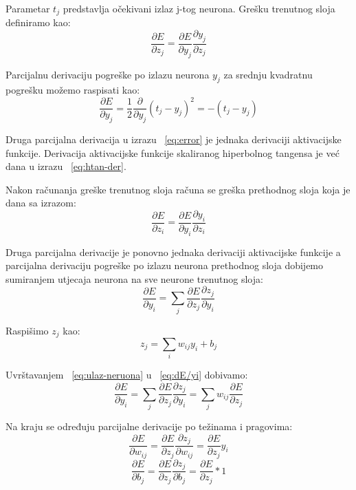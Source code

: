 \documentclass[times, utf8, zavrsni]{fer}
\begin{document}
Parametar $t_j$ predstavlja očekivani izlaz j-tog neurona. Grešku trenutnog sloja definiramo kao:
\begin{equation}\label{eq:error}
\dfrac{\partial E}{\partial z_j} = \dfrac{\partial E}{\partial y_j} \dfrac{\partial y_j}{\partial z_j}
\end{equation}

Parcijalnu derivaciju pogreške po izlazu neurona $y_j$ za srednju kvadratnu pogrešku možemo raspisati kao:
\begin{equation}\label{eq:sr-kv-pogr-der}
\dfrac{\partial E}{\partial y_j} = \frac{1}{2}\dfrac{\partial}{\partial y_j}(t_j-y_j)^2 = -(t_j - y_j)
\end{equation}

Druga parcijalna derivacija u izrazu ~\ref{eq:error} je jednaka derivaciji aktivacijske funkcije. Derivacija aktivacijske funkcije skaliranog hiperbolnog tangensa je već dana u izrazu ~\ref{eq:htan-der}.

Nakon računanja greške trenutnog sloja računa se greška prethodnog sloja koja je dana sa izrazom:
\begin{equation}\label{eq:error-prethodni}
\dfrac{\partial E}{\partial z_i} = \dfrac{\partial E}{\partial y_i} \dfrac{\partial y_i}{\partial z_i} 
\end{equation}

Druga parcijalna derivacije je ponovno jednaka derivaciji aktivacijske funkcije a parcijalna derivaciju pogreške po izlazu neurona prethodnog sloja dobijemo sumiranjem utjecaja neurona na sve neurone trenutnog sloja:
\begin{equation}\label{eq:dE/yi}
\dfrac{\partial E}{\partial y_i} = \sum_j\dfrac{\partial E}{\partial z_j}\dfrac{\partial z_j}{\partial y_i} 
\end{equation}

Raspišimo $z_j$ kao:
\begin{equation}\label{eq:ulaz-neruona}
z_j = \sum_i w_{ij}y_i + b_j
\end{equation}

Uvrštavanjem ~\ref{eq:ulaz-neruona} u ~\ref{eq:dE/yi} dobivamo:
\begin{equation}\label{eq:dE/yi2}
\dfrac{\partial E}{\partial y_i} = \sum_j\dfrac{\partial E}{\partial z_j}\dfrac{\partial z_j}{\partial y_i} = \sum_j w_{ij}\dfrac{\partial E}{\partial z_j}
\end{equation}

Na kraju se određuju parcijalne derivacije po težinama i pragovima:
\begin{equation}\label{eq:der-w}
\dfrac{\partial E}{\partial w_{ij}} = \dfrac{\partial E}{\partial z_j}\dfrac{\partial z_j}{\partial w_{ij}} = \dfrac{\partial E}{\partial z_j}y_i
\end{equation}
\begin{equation}\label{eq:der-b}
\dfrac{\partial E}{\partial b_j} = \dfrac{\partial E}{\partial z_j}\dfrac{\partial z_j}{\partial b_j} = \dfrac{\partial E}{\partial z_j}*1
\end{equation}
\end{document}

